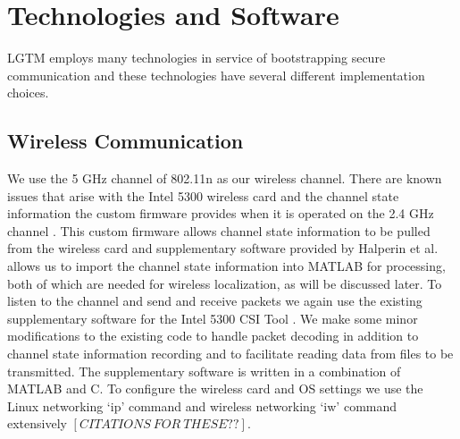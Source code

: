 \documentclass[12pt]{report}
\begin{document}

\section{Technologies and Software}

LGTM employs many technologies in service of bootstrapping secure communication and these technologies have several different implementation choices. \par

\subsection{Wireless Communication}
We use the 5 GHz channel of 802.11n as our wireless channel. There are known issues that arise with the Intel 5300 wireless card and the channel state information the custom firmware provides when it is operated on the 2.4 GHz channel \cite{PhaserGjengset2014,SpotFiKotaru2015}. This custom firmware allows channel state information to be pulled from the wireless card and supplementary software provided by Halperin et al. \cite{ChannelStateInformationToolReleaseHalperin2011} allows us to import the channel state information into MATLAB for processing, both of which are needed for wireless localization, as will be discussed later. To listen to the channel and send and receive packets we again use the existing supplementary software for the Intel 5300 CSI Tool \cite{ChannelStateInformationToolReleaseHalperin2011}. We make some minor modifications to the existing code to handle packet decoding in addition to channel state information recording and to facilitate reading data from files to be transmitted. The supplementary software is written in a combination of MATLAB and C. To configure the wireless card and OS settings we use the Linux networking `ip' command and wireless networking `iw' command extensively $[CITATIONS \: FOR \: THESE??]$. \par
\end{document}
